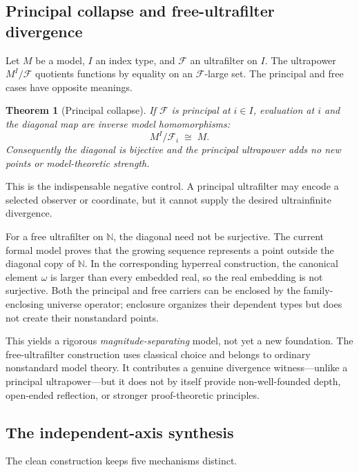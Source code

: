 \documentclass[11pt]{article}
\newtheorem{theorem}{Theorem}
\theoremstyle{definition}
\theoremstyle{remark}
\begin{document}
\subsection{Principal collapse and free-ultrafilter divergence}

Let $M$ be a model, $I$ an index type, and $\mathcal F$ an ultrafilter on $I$.
The ultrapower $M^I/\mathcal F$ quotients functions by equality on an
$\mathcal F$-large set.  The principal and free cases have opposite meanings.

\begin{theorem}[Principal collapse]
If $\mathcal F$ is principal at $i\in I$, evaluation at $i$ and the diagonal map
are inverse model homomorphisms:
\[
  M^I/\mathcal F_i \;\cong\; M.
\]
Consequently the diagonal is bijective and the principal ultrapower adds no new
points or model-theoretic strength.
\end{theorem}

This is the indispensable negative control.  A principal ultrafilter may encode
a selected observer or coordinate, but it cannot supply the desired
ultrainfinite divergence.

For a free ultrafilter on $\mathbb N$, the diagonal need not be surjective.  The
current formal model proves that the growing sequence represents a point outside
the diagonal copy of $\mathbb N$.  In the corresponding hyperreal construction,
the canonical element $\omega$ is larger than every embedded real, so the real
embedding is not surjective.  Both the principal and free carriers can be
enclosed by the family-enclosing universe operator; enclosure organizes their
dependent types but does not create their nonstandard points.

This yields a rigorous \emph{magnitude-separating} model, not yet a new
foundation.  The free-ultrafilter construction uses classical choice and belongs
to ordinary nonstandard model theory.  It contributes a genuine divergence
witness---unlike a principal ultrapower---but it does not by itself provide
non-well-founded depth, open-ended reflection, or stronger proof-theoretic
principles.

\subsection{The independent-axis synthesis}

The clean construction keeps five mechanisms distinct.
\end{document}

